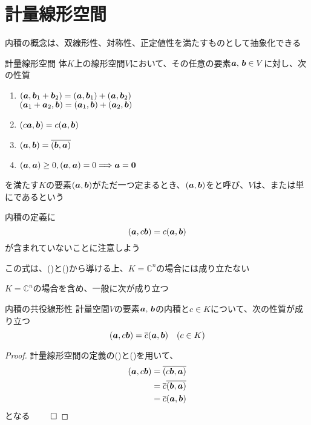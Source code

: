 \documentclass[../../../topic_linear-algebra]{subfiles}
\begin{document}
\sectionline
\section{計量線形空間}

内積の概念は、双線形性、対称性、正定値性を満たすものとして抽象化できる

\begin{definition}{計量線形空間}
  体$K$上の線形空間$V$において、その任意の要素$\vb*{a},\, \vb*{b} \in V$に対し、次の性質
  \begin{enumerate}[label=\romanlabel]
    \item $(\vb*{a}, \vb*{b}_1 + \vb*{b}_2) = (\vb*{a}, \vb*{b}_1) + (\vb*{a}, \vb*{b}_2)$ \\
          $(\vb*{a}_1 + \vb*{a}_2, \vb*{b}) = (\vb*{a}_1, \vb*{b}) + (\vb*{a}_2, \vb*{b})$
    \item $(c\vb*{a}, \vb*{b}) = c(\vb*{a}, \vb*{b})$
    \item $(\vb*{a}, \vb*{b}) = \overline{(\vb*{b}, \vb*{a})}$
    \item $(\vb*{a}, \vb*{a}) \geq 0, (\vb*{a}, \vb*{a}) = 0 \Longrightarrow \vb*{a} = \vb*{0}$
  \end{enumerate}
  を満たす$K$の要素$(\vb*{a},\vb*{b})$がただ一つ定まるとき、$(\vb*{a},\vb*{b})$をと呼び、$V$は、または単にであるという
\end{definition}

内積の定義に
\begin{equation*}
  (\vb*{a}, c\vb*{b}) = c(\vb*{a}, \vb*{b})
\end{equation*}
が含まれていないことに注意しよう

この式は、()と()から導ける上、$K = \mathbb{C}^n$の場合には成り立たない

\br

$K = \mathbb{C}^n$の場合を含め、一般に次が成り立つ

\begin{theorem}{内積の共役線形性}\label{thm:conjugate-linearity-of-inner-product}
  計量空間$V$の要素$\vb*{a},\,\vb*{b}$の内積と$c \in K$について、次の性質が成り立つ
  \begin{equation*}
    (\vb*{a},c\vb*{b}) = \overline{c}(\vb*{a},\vb*{b}) \quad (c \in K)
  \end{equation*}
\end{theorem}

\begin{proof}
  計量線形空間の定義の()と()を用いて、
  \begin{align*}
    (\vb*{a},c\vb*{b}) & = \overline{(c\vb*{b},\vb*{a})}            \\
                       & = \overline{c}\overline{(\vb*{b},\vb*{a})} \\
                       & = \overline{c}(\vb*{a},\vb*{b})
  \end{align*}
  となる $\qed$
\end{proof}
\end{document}
